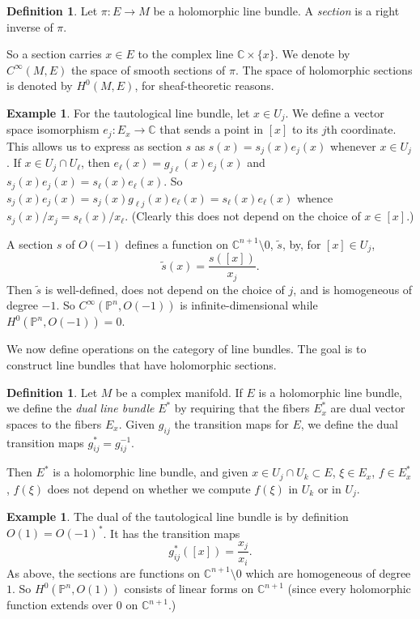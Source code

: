 \documentclass[12pt]{report}
\newcommand{\CC}{\mathbb{C}}
\newcommand{\PP}{\mathbb{P}}
\newcommand{\dfn}[1]{\emph{#1}\index{#1}}
\theoremstyle{definition}
\newtheorem{definition}[theorem]{Definition}
\newtheorem{example}[theorem]{Example}
\begin{document}
\begin{definition}
    Let $\pi: E \to M$ be a holomorphic line bundle. A \dfn{section} is a right inverse of $\pi$.
\end{definition}
    So a section carries $x \in E$ to the complex line $\CC \times \{x\}$. We denote by $C^\infty(M, E)$ the space of smooth sections of $\pi$. The space of holomorphic sections is denoted by $H^0(M, E)$, for sheaf-theoretic reasons.
\begin{example}
    For the tautological line bundle, let $x \in U_j$. We define a vector space isomorphism $e_j: E_x \to \CC$ that sends a point in $[x]$ to its $j$th coordinate. This allows us to express as section $s$ as $s(x) = s_j(x) e_j(x)$ whenever $x \in U_j$. If $x \in U_j \cap U_\ell$, then $e_\ell(x) = g_{j \ell}(x)e_j(x)$ and $s_j(x) e_j(x) = s_\ell(x) e_\ell(x)$. So $s_j(x) e_j(x) = s_j(x) g_{\ell j}(x) e_\ell(x) = s_\ell(x) e_\ell(x)$ whence $s_j(x)/x_j = s_\ell(x)/x_\ell$. (Clearly this does not depend on the choice of $x \in [x]$.)

    A section $s$ of $O(-1)$ defines a function on $\CC^{n+1} \setminus 0$, $\tilde s$, by, for $[x] \in U_j$,
    $$\tilde s(x) = \frac{s([x])}{x_j}.$$
    Then $\tilde s$ is well-defined, does not depend on the choice of $j$, and is homogeneous of degree $-1$. So $C^\infty(\PP^n, O(-1))$ is infinite-dimensional while $H^0(\PP^n, O(-1)) = 0$.
\end{example}
    We now define operations on the category of line bundles. The goal is to construct line bundles that have holomorphic sections.
\begin{definition}
    Let $M$ be a complex manifold. If $E$ is a holomorphic line bundle, we define the \dfn{dual line bundle} $E^*$ by requiring that the fibers $E_x^*$ are dual vector spaces to the fibers $E_x$. Given $g_{ij}$ the transition maps for $E$, we define the dual transition maps $g_{ij}^* = g_{ij}^{-1}$.
\end{definition}
    Then $E^*$ is a holomorphic line bundle, and given $x \in U_j \cap U_k \subset E$, $\xi \in E_x$, $f \in E_x^*$, $f(\xi)$ does not depend on whether we compute $f(\xi)$ in $U_k$ or in $U_j$.
\begin{example}
    The dual of the tautological line bundle is by definition $O(1) = O(-1)^*$. It has the transition maps
    $$g_{ij}^*([x]) = \frac{x_j}{x_i}.$$
    As above, the sections are functions on $\CC^{n+1} \setminus 0$ which are homogeneous of degree $1$. So $H^0(\PP^n, O(1))$ consists of linear forms on $\CC^{n+1}$ (since every holomorphic function extends over $0$ on $\CC^{n+1}$.)
\end{example}
\end{document}
